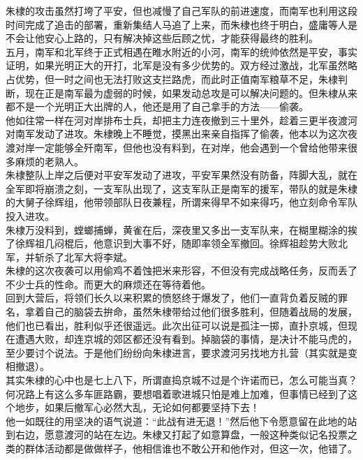 \begin{multicols}{\theparacolNo}
朱棣的攻击虽然打垮了平安，但也减慢了自己军队的前进速度，而南军也利用这段时间完成了追击的部署，重新集结人马追了上来，而朱棣也终于明白，盛庸等人是不会让他安心上路的，只有解决掉这些后顾之忧，才能获得最终的胜利。\\

五月，南军和北军终于正式相遇在睢水附近的小河，南军的统帅依然是平安，事实证明，如果光明正大的开打，北军是没有多少优势的。双方经过激战，北军虽然略占优势，但一时之间也无法打败这支拦路虎，而此时正值南军粮草不足，朱棣判断，现在正是南军最为虚弱的时候，如果发动总攻是可以解决问题的。但朱棣从来都不是一个光明正大出牌的人，他还是用了自己拿手的方法——偷袭。\\

他如往常一样在河对岸排布士兵，却把主力连夜撤到三十里外，趁着三更半夜渡河对南军发动了进攻。朱棣晚上不睡觉，摸黑出来亲自指挥了偷袭，他本以为这次夜渡对岸一定能够全歼南军，但他也没有料到，在对岸，他会遇到一个曾给他带来很多麻烦的老熟人。\\

朱棣整队上岸之后便对平安军发动了进攻，平安军果然没有防备，阵脚大乱，就在全军即将崩溃之刻，一支军队出现了，这支军队正是南军的援军，带队的就是朱棣的大舅子徐辉组，他带领部队日夜兼程，所谓来得早不如来得巧，他立刻命令军队投入进攻。\\

朱棣万没料到，螳螂捕蝉，黄雀在后，深夜里又多出一支军队来，在糊里糊涂的挨了徐辉祖几闷棍后，他意识到大事不好，随即率领全军撤回。徐辉祖趁势大败北军，并斩杀了北军大将李斌。\\

朱棣的这次夜袭可以用偷鸡不着蚀把米来形容，不但没有完成战略任务，反而丢了不少士兵的性命。而更大的麻烦还在等待着他。\\

回到大营后，将领们长久以来积累的愤怒终于爆发了，他们一直背负着反贼的罪名，拿着自己的脑袋去拚命，虽然朱棣带给过他们很多胜利，但随着战局的发展，他们也已看出，胜利似乎还很遥远。此次出征可以说是孤注一掷，直扑京城，但现在遭遇大败，却连京城的郊区都还没有看到。掉脑袋的事情，是决计不能马虎的，至少要讨个说法。于是他们纷纷向朱棣进言，要求渡河另找地方扎营（其实就是变相撤退）。\\

其实朱棣的心中也是七上八下，所谓直捣京城不过是个许诺而已，怎么可能当真？何况路上有这么多车匪路霸，要想唱着歌进城只怕是难上加难，但事情已经到了这个地步，如果后撤军心必然大乱，无论如何都要坚持下去！\\

他一如既往的用坚决的语气说道：“此战有进无退！”然后他下令愿意留在此地的站到右边，愿意渡河的站在左边。朱棣又打起了如意算盘，一般这种类似记名投票之类的群体活动都是做做样子，他相信谁也不敢公开和他作对，但这一次，他错了。\\


\end{multicols}
